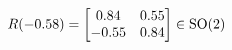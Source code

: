 \documentclass[preview]{standalone}
\begin{document}
\begin{align*}
\special{dvisvgm:raw <g id='unique000'>}R(-0.58) = \begin{bmatrix} 0.84 & 0.55 \\ -0.55 & 0.84 \end{bmatrix} \in \text{SO}(2)\special{dvisvgm:raw </g>}
\end{align*}
\end{document}
